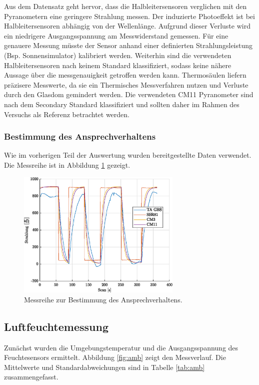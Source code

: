 Aus dem Datensatz geht hervor, dass die Halbleitersensoren verglichen mit den Pyranometern eine geringere Strahlung messen. Der induzierte Photoeffekt ist bei Halbleitersensoren abhängig von der Wellenlänge. Aufgrund dieser Verluste wird ein niedrigere Ausgangsspannung am Messwiderstand gemessen. Für eine genauere Messung müsste der Sensor anhand einer definierten Strahlungsleistung (Bsp. Sonnensimulator) kalibriert werden. Weiterhin sind die verwendeten Halbleitersensoren nach keinem Standard klassifiziert, sodass keine nähere Aussage über die messgenauigkeit getroffen werden kann. Thermosäulen liefern präzisere Messwerte, da sie ein Thermisches Messverfahren nutzen und Verluste durch den Glasdom gemindert werden. Die verwendeten CM11 Pyranometer sind nach dem Secondary Standard klassifiziert und sollten daher im Rahmen des Versuchs als Referenz betrachtet werden.


\subsubsection{Bestimmung des Ansprechverhaltens}
Wie im vorherigen Teil der Auswertung wurden bereitgestellte Daten verwendet. Die Messreihe ist in Abbildung \ref{fig:response} gezeigt.
\begin{figure}[H]
	\centering
	\includegraphics[width=0.7\textwidth]{../DATA/Messreihe_Ansprechzeit.eps}
	\caption[Messreihe zur Bestimmung des Ansprechverhaltens.]{Messreihe zur Bestimmung des Ansprechverhaltens.}
	\label{fig:response}
\end{figure}

\subsection{Luftfeuchtemessung}
Zunächst wurden die Umgebungstemperatur und die Ausgangsspannung des Feuchtesensors ermittelt. Abbildung \ref{fig:amb} zeigt den Messverlauf. Die Mittelwerte und Standardabweichungen sind in Tabelle \ref{tab:amb} zusammengefasst.

